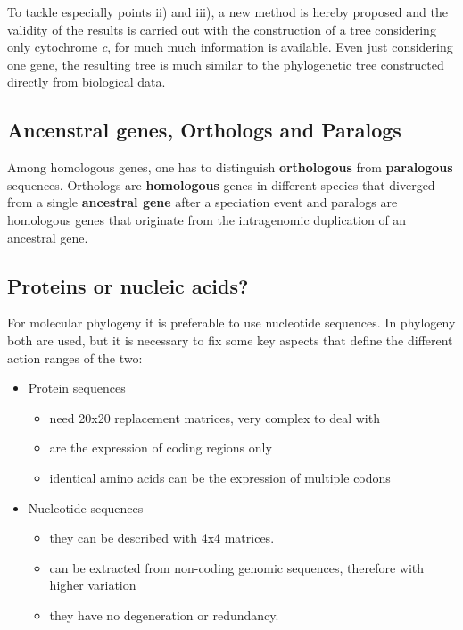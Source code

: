 To tackle especially points ii) and iii), a new method is hereby proposed and the validity of the results is carried out with the construction of a tree considering only cytochrome \textit{c}, for much much information is available.
Even just considering one gene, the resulting tree is much similar to the phylogenetic tree constructed directly from biological data.

\subsection{Ancenstral genes, Orthologs and Paralogs}
Among homologous genes, one has to distinguish \textbf{orthologous} from \textbf{paralogous} sequences. Orthologs are \textbf{homologous} genes in different species that diverged from a single \textbf{ancestral gene} after a speciation event and paralogs are homologous genes that originate from the intragenomic duplication of an ancestral gene.

\subsection{Proteins or nucleic acids?}
For molecular phylogeny it is preferable to use nucleotide sequences.
In phylogeny both are used, but it is necessary to fix some key aspects that define the different action ranges of the two:
\begin{itemize}
\item Protein sequences
	\begin{itemize}
	\item need 20x20 replacement matrices, very complex to deal with
	\item are the expression of coding regions only
	\item identical amino acids can be the expression of multiple codons
	\end{itemize}

\item Nucleotide sequences
	\begin{itemize}
	\item they can be described with 4x4 matrices.
	\item can be extracted from non-coding genomic sequences, therefore with higher variation
	\item they have no degeneration or redundancy.
\end{itemize}

\end{itemize}

